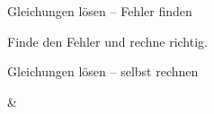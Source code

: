 \begin{aufgabe}{Gleichungen lösen – Fehler finden}
\begin{teile}
\teil Finde den Fehler und rechne richtig. 
\end{teile}
\end{aufgabe}

\begin{aufgabe}{Gleichungen lösen – selbst rechnen}
\begin{gleichungsraster}[2]
 & \\
\end{gleichungsraster}
\end{aufgabe}
